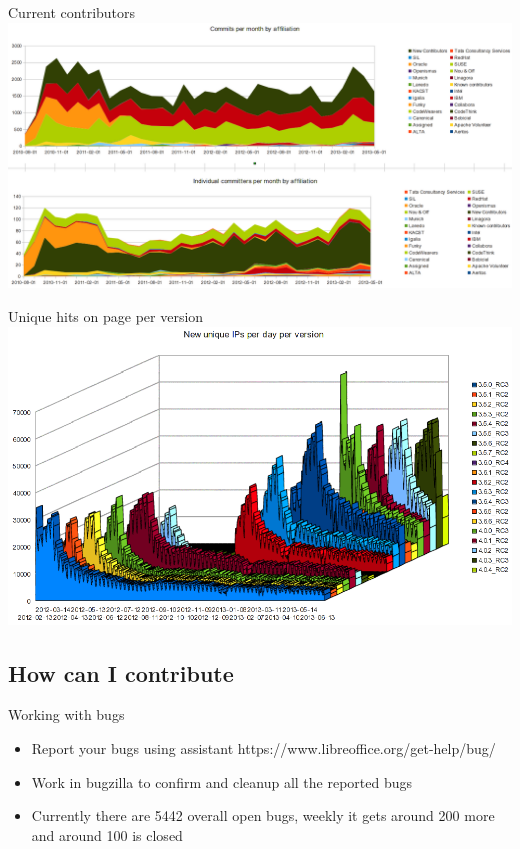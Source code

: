 \documentclass{beamer}
\begin{document}
\begin{frame}{Current contributors}
	\includegraphics[width= 1.0\linewidth]{contribution-graph.png}
\end{frame}

\begin{frame}{Unique hits on page per version}
	\includegraphics[width= 1.0\linewidth]{downloads-unique.png}
\end{frame}

\subsection{How can I contribute}

\begin{frame}[t]{Working with bugs}
	\begin{itemize}
	\item Report your bugs using assistant https://www.libreoffice.org/get-help/bug/
	\item Work in bugzilla to confirm and cleanup all the reported bugs
	\item Currently there are 5442 overall open bugs, weekly it gets around 200 more and around 100 is closed
	\end{itemize}
\end{frame}
\end{document}
